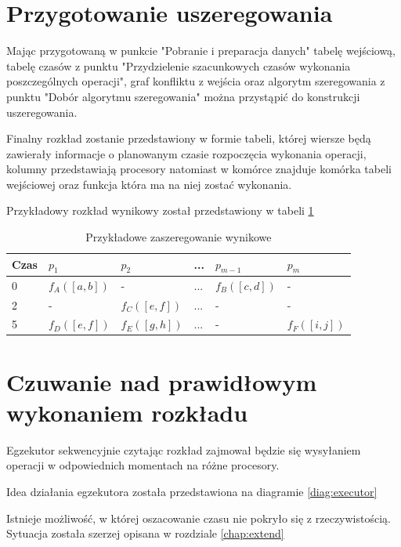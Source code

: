 \documentclass[brudnopis]{xmgr}
\begin{document}
\section{Przygotowanie uszeregowania}

Mając przygotowaną w punkcie "Pobranie i preparacja danych" tabelę wejściową, tabelę czasów z punktu "Przydzielenie szacunkowych czasów wykonania poszczególnych operacji", graf konfliktu z wejścia oraz algorytm szeregowania z punktu "Dobór algorytmu szeregowania" można przystąpić do konstrukcji uszeregowania.

Finalny rozkład zostanie przedstawiony w formie tabeli, której wiersze będą zawierały informacje o planowanym czasie rozpoczęcia wykonania operacji, kolumny przedstawiają procesory natomiast w komórce znajduje komórka tabeli wejściowej oraz funkcja która ma na niej zostać wykonania. 

Przykładowy rozkład wynikowy został przedstawiony w tabeli \ref{tab:example-sched-out}


\begin{table}[!tbh]
\begin{tabular}{|l|l|l|l|l|l|} \hline
Czas & $p_1$ & $p_2$ & ... & $p_{m-1}$ & $p_{m}$ \\ \hline
0 & $f_A([a,b])$ & - & ... & $f_B([c,d])$ & - \\ \hline
2 & - & $f_C([e,f])$ & ... & - & - \\ \hline
5 & $f_D([e,f])$ & $f_E([g,h])$ & ... & - & $f_F([i,j])$\\ \hline
\end{tabular}
\caption{Przykładowe zaszeregowanie wynikowe\label{tab:example-sched-out}}
\end{table}


\section{Czuwanie nad prawidłowym wykonaniem rozkładu}

Egzekutor sekwencyjnie czytając rozkład zajmował będzie się wysyłaniem operacji w odpowiednich momentach na różne procesory.

Idea działania egzekutora została przedstawiona na diagramie \ref{diag:executor}

Istnieje możliwość, w której oszacowanie czasu nie pokryło się z rzeczywistością. Sytuacja została szerzej opisana w rozdziale \ref{chap:extend}
\end{document}

